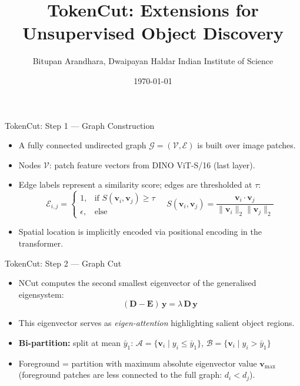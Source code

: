 \documentclass{beamer}
\title{TokenCut: Extensions for Unsupervised Object Discovery}
\author{Bitupan Arandhara, Dwaipayan Haldar \protect\linebreak Indian Institute of Science}
\date{\today}
\begin{document}
\begin{frame}
\maketitle
\end{frame}

\begin{frame}{TokenCut: Step 1 — Graph Construction}
\begin{itemize}
    \item A fully connected undirected graph $\mathcal{G} = (\mathcal{V}, \mathcal{E})$ is built over image patches.
    \item Nodes $\mathcal{V}$: patch feature vectors from DINO ViT-S/16 (last layer).
    \item Edge labels represent a similarity score; edges are thresholded at $\tau$:
    \[
        \mathcal{E}_{i,j} = \begin{cases} 1, & \text{if } S(\mathbf{v}_i, \mathbf{v}_j) \geq \tau \\ \epsilon, & \text{else} \end{cases}
        \quad S(\mathbf{v}_i,\mathbf{v}_j) = \frac{\mathbf{v}_i \cdot \mathbf{v}_j}{\|\mathbf{v}_i\|_2 \|\mathbf{v}_j\|_2}
    \]
    \item Spatial location is implicitly encoded via positional encoding in the transformer.
\end{itemize}
\end{frame}

\begin{frame}{TokenCut: Step 2 — Graph Cut}
\begin{itemize}
    \item NCut computes the second smallest eigenvector of the generalised eigensystem:
    \[
        (\mathbf{D} - \mathbf{E})\,\mathbf{y} = \lambda\,\mathbf{D}\,\mathbf{y}
    \]
    \item This eigenvector serves as \textit{eigen-attention} highlighting salient object regions.
    \item \textbf{Bi-partition:} split at mean $\bar{y}_1$:
    $\mathcal{A} = \{\mathbf{v}_i \mid y_i \leq \bar{y}_1\}$, $\mathcal{B} = \{\mathbf{v}_i \mid y_i > \bar{y}_1\}$
    \item Foreground = partition with maximum absolute eigenvector value $\mathbf{v}_{\max}$ (foreground patches are less connected to the full graph: $d_i < d_j$).
\end{itemize}
\end{frame}
\end{document}
